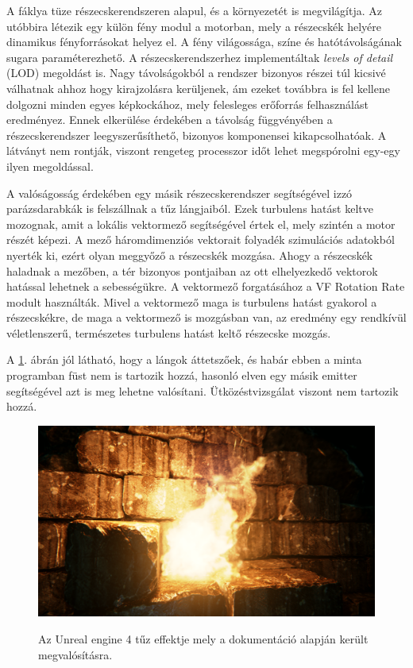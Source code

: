 A fáklya tüze részecskerendszeren alapul, és a környezetét is megvilágítja. Az utóbbira létezik egy külön fény modul a motorban, mely a részecskék helyére dinamikus fényforrásokat helyez el. A fény világossága, színe és hatótávolságának sugara paraméterezhető. A részecskerendszerhez implementáltak \textit{levels of detail} (LOD) megoldást is. Nagy távolságokból a rendszer bizonyos részei túl kicsivé válhatnak ahhoz hogy kirajzolásra kerüljenek, ám ezeket továbbra is fel kellene dolgozni minden egyes képkockához, mely felesleges erőforrás felhasználást eredményez. Ennek elkerülése érdekében a távolság függvényében a részecskerendszer leegyszerűsíthető, bizonyos komponensei kikapcsolhatóak. A látványt nem rontják, viszont rengeteg processzor időt lehet megspórolni egy-egy ilyen megoldással.   \cite{UEngineFireExample}

A valóságosság érdekében egy másik részecskerendszer segítségével izzó parázsdarabkák is felszállnak a tűz lángjaiból. Ezek turbulens hatást keltve mozognak, amit a lokális vektormező segítségével értek el, mely szintén a motor részét képezi. A mező háromdimenziós vektorait folyadék szimulációs adatokból nyerték ki, ezért olyan meggyőző a részecskék mozgása. Ahogy a részecskék haladnak a mezőben, a tér bizonyos pontjaiban az ott elhelyezkedő vektorok hatással lehetnek a sebességükre. A vektormező forgatásához a VF Rotation Rate modult használták. Mivel a vektormező maga is turbulens hatást gyakorol a részecskékre, de maga a vektormező is mozgásban van, az eredmény egy rendkívül véletlenszerű, természetes turbulens hatást keltő részecske mozgás. \cite{UEngineFireExample}

A \ref{fig:UE4fire}. ábrán jól látható, hogy a lángok áttetszőek, és habár ebben a minta programban füst nem is tartozik hozzá, hasonló elven egy másik emitter segítségével azt is meg lehetne valósítani. Ütközéstvizsgálat viszont nem tartozik hozzá.

\begin{figure}[h]
 \caption{Az Unreal engine 4 tűz effektje mely a dokumentáció alapján került megvalósításra. \cite{UEngineFireExample}}
 \includegraphics[width=\textwidth]{kepek/UE4flame.png}
 \label{fig:UE4fire}
\end{figure}

